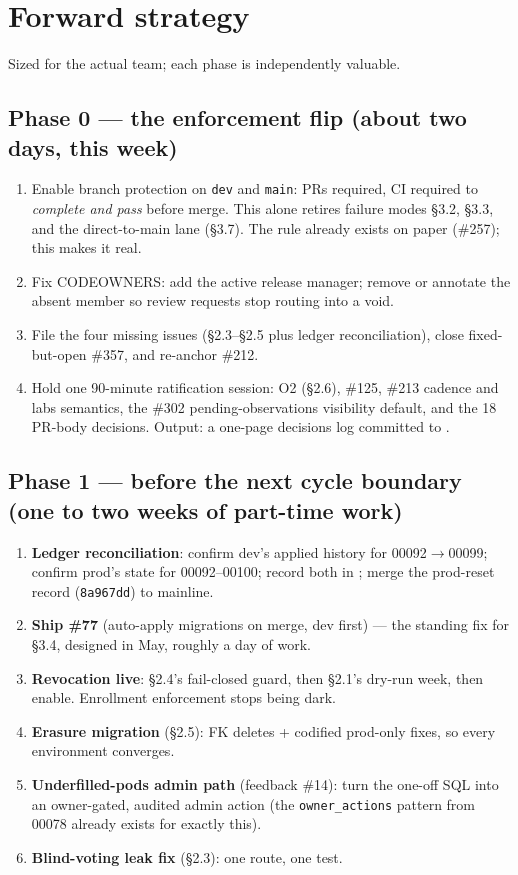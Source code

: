 \documentclass[10pt]{article}
\newcommand{\gh}[1]{\mbox{\##1}}
\begin{document}
\section{Forward strategy}
Sized for the actual team; each phase is independently valuable.

\subsection{Phase 0 --- the enforcement flip (about two days, this week)}
\begin{enumerate}
  \item Enable branch protection on \texttt{dev} and \texttt{main}: PRs required, CI required to \emph{complete and pass} before merge. This alone retires failure modes \S3.2, \S3.3, and the direct-to-main lane (\S3.7). The rule already exists on paper (\gh{257}); this makes it real.
  \item Fix CODEOWNERS: add the active release manager; remove or annotate the absent member so review requests stop routing into a void.
  \item File the four missing issues (\S2.3--\S2.5 plus ledger reconciliation), close fixed-but-open \gh{357}, and re-anchor \gh{212}.
  \item Hold one 90-minute ratification session: O2 (\S2.6), \gh{125}, \gh{213} cadence and labs semantics, the \gh{302} pending-observations visibility default, and the 18 PR-body decisions. Output: a one-page decisions log committed to .
\end{enumerate}

\subsection{Phase 1 --- before the next cycle boundary (one to two weeks of part-time work)}
\begin{enumerate}
  \item \textbf{Ledger reconciliation}: confirm dev's applied history for 00092$\rightarrow$00099; confirm prod's state for 00092--00100; record both in ; merge the prod-reset record (\texttt{8a967dd}) to mainline.
  \item \textbf{Ship \gh{77}} (auto-apply migrations on merge, dev first) --- the standing fix for \S3.4, designed in May, roughly a day of work.
  \item \textbf{Revocation live}: \S2.4's fail-closed guard, then \S2.1's dry-run week, then enable. Enrollment enforcement stops being dark.
  \item \textbf{Erasure migration} (\S2.5): FK deletes + codified prod-only fixes, so every environment converges.
  \item \textbf{Underfilled-pods admin path} (feedback \#14): turn the one-off SQL into an owner-gated, audited admin action (the \texttt{owner\_actions} pattern from 00078 already exists for exactly this).
  \item \textbf{Blind-voting leak fix} (\S2.3): one route, one test.
\end{enumerate}
\end{document}
